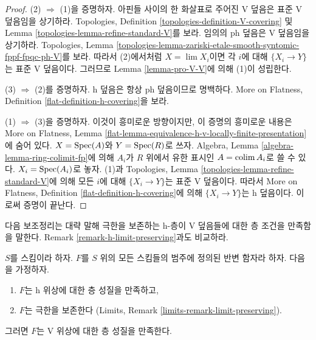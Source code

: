 \begin{proof}
(2) $\Rightarrow$ (1)을 증명하자. 아핀들 사이의 한 화살표로 주어진
V 덮음은 표준 V 덮음임을 상기하라. Topologies, Definition
\ref{topologies-definition-V-covering} 및 Lemma
\ref{topologies-lemma-refine-standard-V}를 보라.
임의의 ph 덮음은 V 덮음임을 상기하라. Topologies, Lemma
\ref{topologies-lemma-zariski-etale-smooth-syntomic-fppf-fpqc-ph-V}를 보라.
따라서 (2)에서처럼 $X = \lim X_i$이면 각 $i$에 대해
$\{X_i \to Y\}$는 표준 V 덮음이다. 그러므로 Lemma
\ref{lemma-pro-V-V}에 의해 (1)이 성립한다.

\medskip\noindent
(3) $\Rightarrow$ (2)를 증명하자. h 덮음은 항상 ph 덮음이므로 명백하다.
More on Flatness, Definition \ref{flat-definition-h-covering}을 보라.

\medskip\noindent
(1) $\Rightarrow$ (3)을 증명하자. 이것이 흥미로운 방향이지만,
이 증명의 흥미로운 내용은 More on Flatness, Lemma
\ref{flat-lemma-equivalence-h-v-locally-finite-presentation}에 숨어 있다.
$X = \mathop{\mathrm{Spec}}(A)$와 $Y = \mathop{\mathrm{Spec}}(R)$로 쓰자. Algebra, Lemma
\ref{algebra-lemma-ring-colimit-fp}에 의해 $A_i$가 $R$ 위에서
유한 표시인 $A = \mathop{\mathrm{colim}}\nolimits A_i$로 쓸 수 있다. $X_i = \mathop{\mathrm{Spec}}(A_i)$로 놓자.
(1)과 Topologies, Lemma
\ref{topologies-lemma-refine-standard-V}에 의해 모든 $i$에 대해
$\{X_i \to Y\}$는 표준 V 덮음이다. 따라서 More on Flatness,
Definition \ref{flat-definition-h-covering}에 의해
$\{X_i \to Y\}$는 h 덮음이다. 이로써 증명이 끝난다.
\end{proof}

\noindent
다음 보조정리는 대략 말해 극한을 보존하는 h-층이 V 덮음들에 대한
층 조건을 만족함을 말한다. Remark \ref{remark-h-limit-preserving}과도 비교하라.

\begin{lemma}
\label{lemma-h-limit-preserving}
$S$를 스킴이라 하자. $F$를 $S$ 위의 모든 스킴들의 범주에 정의된
반변 함자라 하자. 다음을 가정하자.
\begin{enumerate}
\item $F$는 h 위상에 대한 층 성질을 만족하고,
\item $F$는 극한을 보존한다
(Limits, Remark \ref{limits-remark-limit-preserving}).
\end{enumerate}
그러면 $F$는 V 위상에 대한 층 성질을 만족한다.
\end{lemma}

